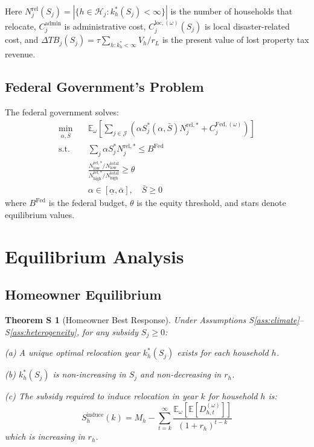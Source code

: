 \documentclass[11pt,letterpaper]{article}
\newtheorem{theoremS}{Theorem S}
\theoremstyle{definition}
\newcommand{\E}{\mathbb{E}}
\begin{document}
Here $N_j^{\text{rel}}(S_j) = |\{h \in \mathcal{H}_j : k_h^*(S_j) < \infty\}|$ is the number of households that relocate, $C_j^{\text{admin}}$ is administrative cost, $C_{j}^{\text{loc},(\omega)}(S_j)$ is local disaster-related cost, and $\Delta TB_j(S_j) = \tau \sum_{h: k_h^* < \infty} V_h / r_L$ is the present value of lost property tax revenue.

\subsection{Federal Government's Problem}

The federal government solves:
\begin{equation}\label{eq:federal_full}
\begin{aligned}
\min_{\alpha, \bar{S}} \quad & \E_\omega\left[\sum_{j \in \mathcal{J}} \left(\alpha S_j^*(\alpha, \bar{S}) N_j^{\text{rel},*} + C_j^{\text{Fed},(\omega)}\right)\right] \\
\text{s.t.} \quad & \sum_{j} \alpha S_j^* N_j^{\text{rel},*} \leq B^{\text{Fed}} \\
& \frac{N_{\text{low}}^{\text{rel},*} / N_{\text{low}}^{\text{total}}}{N_{\text{high}}^{\text{rel},*} / N_{\text{high}}^{\text{total}}} \geq \theta \\
& \alpha \in [\underline{\alpha}, \bar{\alpha}], \quad \bar{S} \geq 0
\end{aligned}
\end{equation}
where $B^{\text{Fed}}$ is the federal budget, $\theta$ is the equity threshold, and stars denote equilibrium values.

\section{Equilibrium Analysis}

\subsection{Homeowner Equilibrium}

\begin{theoremS}[Homeowner Best Response]\label{thm:homeowner}
Under Assumptions S\ref{ass:climate}--S\ref{ass:heterogeneity}, for any subsidy $S_j \geq 0$:

(a) A unique optimal relocation year $k_h^*(S_j)$ exists for each household $h$.

(b) $k_h^*(S_j)$ is non-increasing in $S_j$ and non-decreasing in $r_h$.

(c) The subsidy required to induce relocation in year $k$ for household $h$ is:
\begin{equation}
S_h^{\text{induce}}(k) = M_h - \sum_{t=k}^{\infty} \frac{\E_\omega[\E[D_{h,t}^{(\omega)}]]}{(1+r_h)^{t-k}}
\end{equation}
which is increasing in $r_h$.
\end{theoremS}
\end{document}
